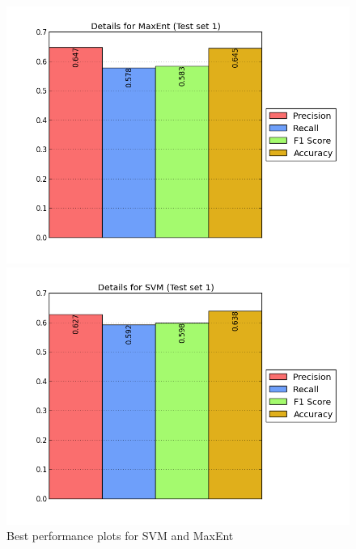 \begin{figure}[htb]
	\centering
	\begin{minipage}{.45\linewidth}
		\includegraphics[width=\linewidth]{../img/plots/analysis/maxent_stats_best.png}
	\end{minipage}
	\hspace{0.05\linewidth}
	\begin{minipage}{.45\linewidth}
		\includegraphics[width=\linewidth]{../img/plots/analysis/svm_stats_best.png}
	\end{minipage}
	\caption[Best performance plots for SVM and MaxEnt]{Best performance plots for SVM and MaxEnt}
	\label{fig:best_result}
\end{figure}

